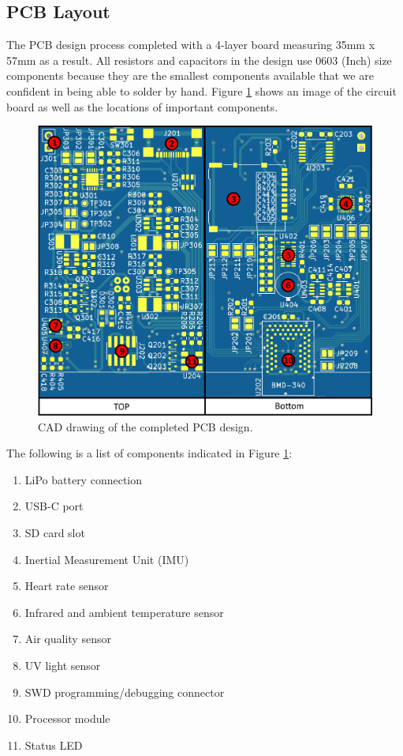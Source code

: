 \subsection{PCB Layout}

The PCB design process completed with a 4-layer board measuring 35mm x 57mm as 
a result. All resistors and capacitors in the design use 0603 (Inch) size 
components because they are the smallest components available that we are
confident in being able to solder by hand. Figure \ref{fig:Board_TopBottom_Annotated}
shows an image of the circuit board as well as the locations of important 
components.

\begin{figure}[!htb]
\centering
\includegraphics[width=\textwidth]{images/Board_TopBottom_Annotated.png}
\caption{CAD drawing of the completed PCB design.}
\label{fig:Board_TopBottom_Annotated}
\end{figure}

The following is a list of components indicated in Figure \ref{fig:Board_TopBottom_Annotated}: 
\begin{enumerate}
   \item LiPo battery connection
   \item USB-C port
   \item SD card slot 
   \item Inertial Measurement Unit (IMU)
   \item Heart rate sensor
   \item Infrared and ambient temperature sensor
   \item Air quality sensor
   \item UV light sensor
   \item SWD programming/debugging connector
   \item Processor module
   \item Status LED
\end{enumerate}

